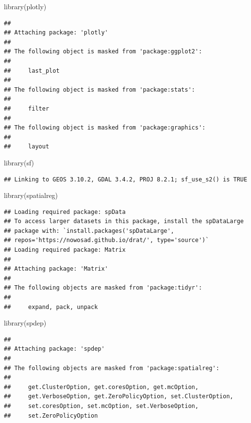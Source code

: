 \documentclass[
]{article}
\newenvironment{Shaded}{\begin{snugshade}}{\end{snugshade}}
\newcommand{\FunctionTok}[1]{\textcolor[rgb]{0.00,0.00,0.00}{#1}}
\newcommand{\NormalTok}[1]{#1}
\begin{document}
\begin{Shaded}
\begin{Highlighting}[]
\FunctionTok{library}\NormalTok{(plotly)}
\end{Highlighting}
\end{Shaded}

\begin{verbatim}
## 
## Attaching package: 'plotly'
## 
## The following object is masked from 'package:ggplot2':
## 
##     last_plot
## 
## The following object is masked from 'package:stats':
## 
##     filter
## 
## The following object is masked from 'package:graphics':
## 
##     layout
\end{verbatim}

\begin{Shaded}
\begin{Highlighting}[]
\FunctionTok{library}\NormalTok{(sf)}
\end{Highlighting}
\end{Shaded}

\begin{verbatim}
## Linking to GEOS 3.10.2, GDAL 3.4.2, PROJ 8.2.1; sf_use_s2() is TRUE
\end{verbatim}

\begin{Shaded}
\begin{Highlighting}[]
\FunctionTok{library}\NormalTok{(spatialreg)}
\end{Highlighting}
\end{Shaded}

\begin{verbatim}
## Loading required package: spData
## To access larger datasets in this package, install the spDataLarge
## package with: `install.packages('spDataLarge',
## repos='https://nowosad.github.io/drat/', type='source')`
## Loading required package: Matrix
## 
## Attaching package: 'Matrix'
## 
## The following objects are masked from 'package:tidyr':
## 
##     expand, pack, unpack
\end{verbatim}

\begin{Shaded}
\begin{Highlighting}[]
\FunctionTok{library}\NormalTok{(spdep)}
\end{Highlighting}
\end{Shaded}

\begin{verbatim}
## 
## Attaching package: 'spdep'
## 
## The following objects are masked from 'package:spatialreg':
## 
##     get.ClusterOption, get.coresOption, get.mcOption,
##     get.VerboseOption, get.ZeroPolicyOption, set.ClusterOption,
##     set.coresOption, set.mcOption, set.VerboseOption,
##     set.ZeroPolicyOption
\end{verbatim}
\end{document}
